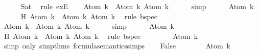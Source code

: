 \begin{isabellebody}
\ \ \ \ \isamarkupfalse%
\ Sat\ \isamarkupfalse%
\ {\isacharparenleft}rule\ exE{\isacharparenright}\isanewline
\ \ \isamarkupfalse%
\ {\isachardoublequoteopen}Atom\ k\ {\isasymin}\ {\isacharbraceleft}Atom\ k{\isacharcomma}\ \isactrlbold {\isasymnot}{\isacharparenleft}Atom\ k{\isacharparenright}{\isacharbraceright}{\isachardoublequoteclose}\isanewline
\ \ \ \ \isamarkupfalse%
\ simp\isanewline
\ \ \isamarkupfalse%
\ {\isachardoublequoteopen}{\isasymA}\ {\isasymTurnstile}\ Atom\ k{\isachardoublequoteclose}\isanewline
\ \ \ \ \isamarkupfalse%
\ H\ {\isacartoucheopen}Atom\ k\ {\isasymin}\ {\isacharbraceleft}Atom\ k{\isacharcomma}\ \isactrlbold {\isasymnot}{\isacharparenleft}Atom\ k{\isacharparenright}{\isacharbraceright}{\isacartoucheclose}\ \isamarkupfalse%
\ {\isacharparenleft}rule\ bspec{\isacharparenright}\isanewline
\ \ \isamarkupfalse%
\ {\isachardoublequoteopen}\isactrlbold {\isasymnot}{\isacharparenleft}Atom\ k{\isacharparenright}\ {\isasymin}\ {\isacharbraceleft}Atom\ k{\isacharcomma}\ \isactrlbold {\isasymnot}{\isacharparenleft}Atom\ k{\isacharparenright}{\isacharbraceright}{\isachardoublequoteclose}\isanewline
\ \ \ \ \isamarkupfalse%
\ simp\isanewline
\ \ \isamarkupfalse%
\ {\isachardoublequoteopen}{\isasymA}\ {\isasymTurnstile}\ \isactrlbold {\isasymnot}{\isacharparenleft}Atom\ k{\isacharparenright}{\isachardoublequoteclose}\isanewline
\ \ \ \ \isamarkupfalse%
\ H\ {\isacartoucheopen}\isactrlbold {\isasymnot}{\isacharparenleft}Atom\ k{\isacharparenright}\ {\isasymin}\ {\isacharbraceleft}Atom\ k{\isacharcomma}\ \isactrlbold {\isasymnot}{\isacharparenleft}Atom\ k{\isacharparenright}{\isacharbraceright}{\isacartoucheclose}\ \isamarkupfalse%
\ {\isacharparenleft}rule\ bspec{\isacharparenright}\isanewline
\ \ \isamarkupfalse%
\ \isamarkupfalse%
\ {\isachardoublequoteopen}{\isasymnot}\ {\isasymA}\ {\isasymTurnstile}\ Atom\ k{\isachardoublequoteclose}\ \isanewline
\ \ \ \ \isamarkupfalse%
\ {\isacharparenleft}simp\ only{\isacharcolon}\ simp{\isacharunderscore}thms{\isacharparenleft}{}{\isacharparenright}\ formula{\isacharunderscore}semantics{\isachardot}simps{\isacharparenleft}{}{\isacharparenright}{\isacharparenright}\isanewline
\ \ \isamarkupfalse%
\ {\isachardoublequoteopen}False{\isachardoublequoteclose}\isanewline
\ \ \ \ \isamarkupfalse%
\ {\isacartoucheopen}{\isasymA}\ {\isasymTurnstile}\ Atom\ k{\isacartoucheclose}\ \isamarkupfalse%

\end{isabellebody}
